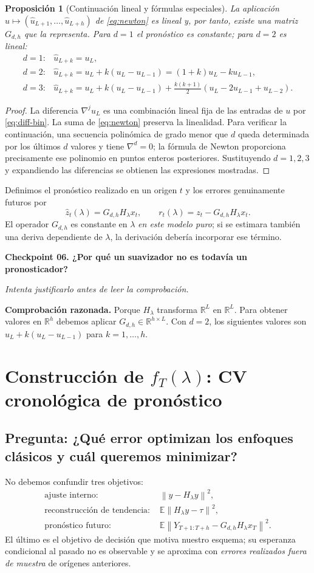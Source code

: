 \documentclass[11pt,letterpaper,parskip=half,headings=small]{scrartcl}
\newtheorem{proposicion}{Proposición}[section]
\theoremstyle{definition}\newtheorem{definicion}[proposicion]{Definición}
\theoremstyle{remark}\newtheorem{observacion}[proposicion]{Observación}
\newcommand{\R}{\mathbb R}\newcommand{\EE}{\mathbb E}\newcommand{\Var}{\operatorname{Var}}
\newcommand{\norm}[1]{\left\lVert#1\right\rVert}\newcommand{\inner}[2]{\left\langle#1,#2\right\rangle}
\newcommand{\pregunta}[1]{\subsection{Pregunta: #1}}
\newcommand{\checkpoint}[3]{%
  \par\medskip\noindent\textbf{\color{blue!45!black}Checkpoint #1. #2}\par
  \noindent\emph{Intenta justificarlo antes de leer la comprobación.}\par
  \noindent\textbf{Comprobación razonada. }#3\par\bigskip
}
\begin{document}
\begin{proposicion}[Continuación lineal y fórmulas especiales]
La aplicación $u\mapsto(\widehat u_{L+1},\ldots,\widehat u_{L+h})$ de \eqref{eq:newton} es lineal y, por tanto, existe una matriz $G_{d,h}$ que la representa. Para $d=1$ el pronóstico es constante; para $d=2$ es lineal:
\[
\begin{array}{ll}
d=1:&\widehat u_{L+k}=u_L,\\
d=2:&\widehat u_{L+k}=u_L+k(u_L-u_{L-1})=(1+k)u_L-ku_{L-1},\\
d=3:&\widehat u_{L+k}=u_L+k(u_L-u_{L-1})+
\frac{k(k+1)}2(u_L-2u_{L-1}+u_{L-2}).
\end{array}
\]
\end{proposicion}
\begin{proof}
La diferencia $\nabla^j u_L$ es una combinación lineal fija de las entradas de $u$ por \eqref{eq:diff-bin}. La suma de \eqref{eq:newton} preserva la linealidad. Para verificar la continuación, una secuencia polinómica de grado menor que $d$ queda determinada por los últimos $d$ valores y tiene $\nabla^d=0$; la fórmula de Newton proporciona precisamente ese polinomio en puntos enteros posteriores. Sustituyendo $d=1,2,3$ y expandiendo las diferencias se obtienen las expresiones mostradas.
\end{proof}

Definimos el pronóstico realizado en un origen $t$ y los errores genuinamente futuros por
\begin{equation}\label{eq:forecast}
\widehat z_t(\lambda)=G_{d,h}H_\lambda x_t,\qquad
r_t(\lambda)=z_t-G_{d,h}H_\lambda x_t.
\end{equation}
El operador $G_{d,h}$ es constante en $\lambda$ \emph{en este modelo puro}; si se estimara también una deriva dependiente de $\lambda$, la derivación debería incorporar ese término.

\checkpoint{06}{¿Por qué un suavizador no es todavía un pronosticador?}{Porque $H_\lambda$ transforma $\R^L$ en $\R^L$. Para obtener valores en $\R^h$ debemos aplicar $G_{d,h}\in\R^{h\times L}$. Con $d=2$, los siguientes valores son $u_L+k(u_L-u_{L-1})$ para $k=1,\ldots,h$.}

\section{Construcción de $f_T(\lambda)$: CV cronológica de pronóstico}
\pregunta{¿Qué error optimizan los enfoques clásicos y cuál queremos minimizar?}
No debemos confundir tres objetivos:\begin{align}
\text{ajuste interno: }& \norm{y-H_\lambda y}^2,\\
\text{reconstrucción de tendencia: }&\EE\norm{H_\lambda y-\tau}^2,\\
\text{pronóstico futuro: }&\EE\norm{Y_{T+1:T+h}-G_{d,h}H_\lambda x_T}^2.
\end{align}
El último es el objetivo de decisión que motiva nuestro esquema; su esperanza condicional al pasado no es observable y se aproxima con \emph{errores realizados fuera de muestra} de orígenes anteriores.
\end{document}
